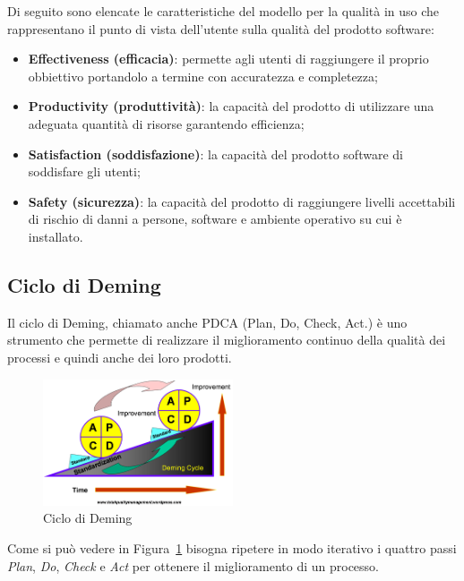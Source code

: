 Di seguito sono elencate le caratteristiche del modello per la qualità in uso che rappresentano il punto di vista dell'utente sulla qualità del prodotto software:

\begin{itemize}
	\item \textbf{Effectiveness (efficacia)}:  permette agli utenti di raggiungere il proprio obbiettivo portandolo a termine con accuratezza e completezza;

	\item \textbf{Productivity (produttività)}: la capacità del prodotto di utilizzare una adeguata quantità di risorse garantendo efficienza;

	\item \textbf{Satisfaction (soddisfazione)}: la capacità del prodotto software di soddisfare gli utenti;

	\item \textbf{Safety (sicurezza)}: la capacità del prodotto di raggiungere livelli accettabili di rischio di danni a persone, software e ambiente operativo su cui è installato.
\end{itemize}

\subsection{Ciclo di Deming}
Il ciclo di Deming, chiamato anche PDCA (Plan, Do, Check, Act.) è uno strumento che permette di realizzare il miglioramento continuo della qualità dei processi e quindi anche dei loro prodotti.

\begin{figure}[h!]
	\centering
	\includegraphics[width=0.50\textwidth]{img/deming.png}
	\caption{Ciclo di Deming}
	\label{fig:PDCA}
\end{figure}

Come si può vedere in Figura~\ref{fig:PDCA} bisogna ripetere in modo iterativo i quattro passi \emph{Plan}, \emph{Do}, \emph{Check} e \emph{Act} per ottenere il miglioramento di un processo.

